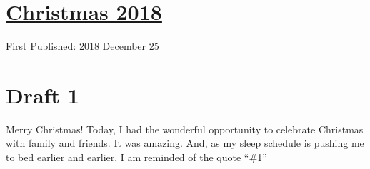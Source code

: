 \documentclass[12pt]{article}[titlepage]
\newcommand{\say}[1]{``\#1''}
\newcommand{\1}{\={a}}
\newcommand{\2}{\={e}}
\newcommand{\3}{\={\i}}
\newcommand{\4}{\=o}
\newcommand{\5}{\=u}
\newcommand{\6}{\={A}}
\renewcommand{\,}{\textsuperscript{,}}
\begin{document}
\doublespacing
\section{\href{christmas-2018.html}{Christmas 2018}}
First Published: 2018 December 25
\section{Draft 1}
Merry Christmas!
Today, I had the wonderful opportunity to celebrate Christmas with family and friends.
It was amazing.
And, as my sleep schedule is pushing me to bed earlier and earlier, I am reminded of the quote \say{merry Christmas to all, and to all a good night.}
\end{document}
